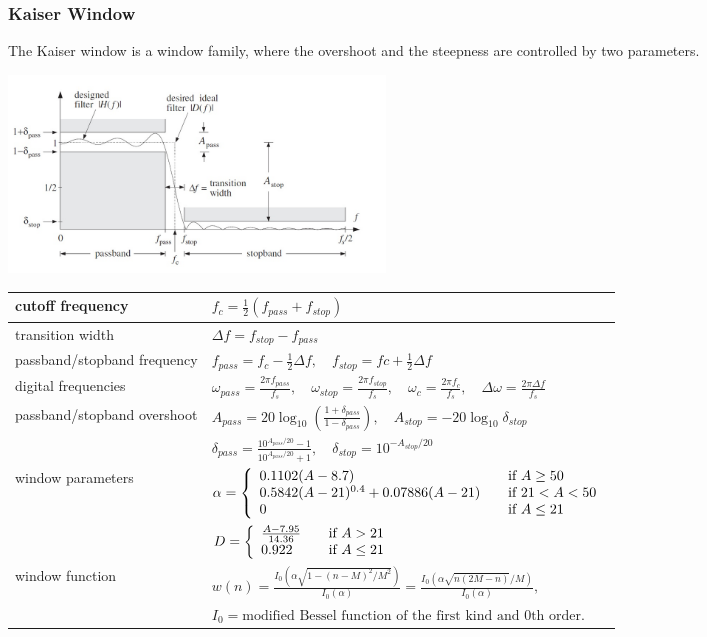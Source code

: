 \newpage
\subsubsection{Kaiser Window}
The Kaiser window is a window family, where the overshoot and the steepness
are controlled by two parameters. \\

\begin{center}
	\includegraphics[width=10cm]{images/FIR_KaiserSpecs.jpg}
\end{center}

\begin{tabular}{|l|l|}
	\hline
	cutoff frequency & $f_c=\frac{1}{2}(f_{pass}+f_{stop})$ \\ \hline
	transition width & $\Delta f = f_{stop}-f_{pass}$\\ \hline
	passband/stopband frequency & $f_{pass} = f_c - \frac{1}{2}\Delta f,\quad f_{stop}= fc+\frac{1}{2}\Delta f$\\ \hline
	digital frequencies & $\omega_{pass}=\frac{2\pi f_{pass}}{f_s},\quad \omega_{stop}=\frac{2\pi f_{stop}}{f_s},\quad
						  \omega_{c}=\frac{2\pi f_c}{f_s},\quad \Delta\omega=\frac{2\pi \Delta f}{f_s}$\\ \hline
	passband/stopband overshoot & $A_{pass}=20\log_{10}\left(\frac{1+\delta_{pass}}{1-\delta_{pass}}\right),\quad A_{stop}=-20\log_{10}\delta_{stop}$\\
								& $\delta_{pass}=\frac{10^{A_{pass}/20}-1}{10^{A_{pass}/20}+1},\quad \delta_{stop} = 10^{-A_{stop}/20}$ \\ \hline
	window parameters &
		$\alpha = \left\{
					\begin{array}{l l}
						0.1102(A-8.7)& \quad \text{if } A \geq 50\\
						0.5842(A-21)^{0.4}+0.07886(A-21) & \quad \text{if }21 < A < 50\\
						0 & \quad \text{if } A \leq 21
					\end{array} \right. $\\
	&	$D = \left\{
					\begin{array}{l l}
						\frac{A-7.95}{14.36}& \quad \text{if } A>21\\
						0.922 & \quad \text{if } A \leq 21
					\end{array} \right. $\\ \hline
	window function & $w(n)=\frac{I_0(\alpha\sqrt{1-(n-M)^2/M^2})}{I_0(\alpha)}=\frac{I_0(\alpha\sqrt{n(2M-n)}/M)}{I_0(\alpha)},$ \\
	& $I_0=\text{modified Bessel function of the first kind and 0th order.}$\\
	\hline
\end{tabular}


